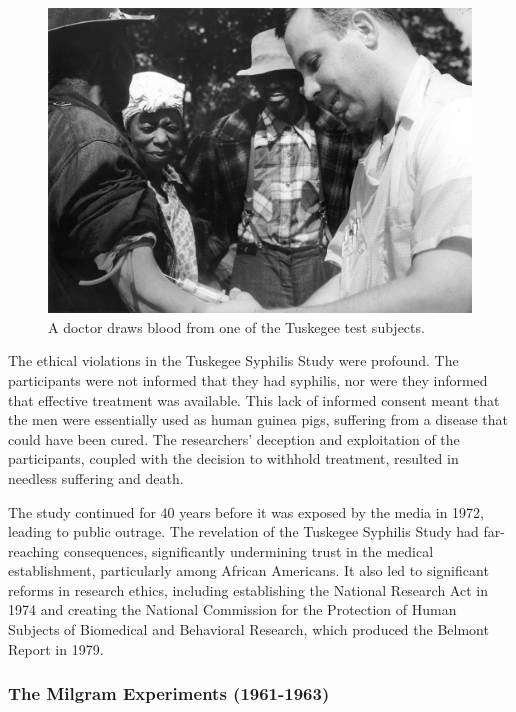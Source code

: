 \documentclass[
]{book}
\begin{document}
\begin{figure}
\centering
\includegraphics[width=1\textwidth,height=\textheight]{images/Tuskegee-syphilis-study.jpg}
\caption{A doctor draws blood from one of the Tuskegee test subjects.}
\end{figure}

The ethical violations in the Tuskegee Syphilis Study were profound. The participants were not informed that they had syphilis, nor were they informed that effective treatment was available. This lack of informed consent meant that the men were essentially used as human guinea pigs, suffering from a disease that could have been cured. The researchers' deception and exploitation of the participants, coupled with the decision to withhold treatment, resulted in needless suffering and death.

The study continued for 40 years before it was exposed by the media in 1972, leading to public outrage. The revelation of the Tuskegee Syphilis Study had far-reaching consequences, significantly undermining trust in the medical establishment, particularly among African Americans. It also led to significant reforms in research ethics, including establishing the National Research Act in 1974 and creating the National Commission for the Protection of Human Subjects of Biomedical and Behavioral Research, which produced the Belmont Report in 1979.

\subsubsection*{The Milgram Experiments (1961-1963)}\label{the-milgram-experiments-1961-1963}
\end{document}
